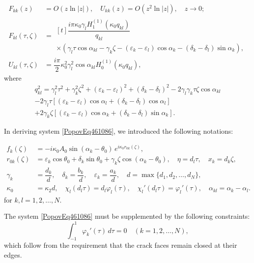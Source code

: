 \begin{align*}
	F_{kk}(z) &= O(z \ln |z|), \quad 
	U_{kk}(z) = O(z^2 \ln |z|), \quad z \to 0;
	\\
	F_{kl}(\tau, \zeta) &=
	\begin{multlined}[t]
		\dfrac{i\pi \kappa_0 \gamma_l H_1^{(1)}(\kappa_0 q_{kl})}{q_{kl}} 
		\\
		\times \left( \gamma_l \tau \cos \alpha_{kl} - \gamma_k \zeta - (\varepsilon_k - \varepsilon_l) \cos \alpha_k - (\delta_k - \delta_l) \sin \alpha_k \right),
	\end{multlined}
	\\
	U_{kl}(\tau, \zeta) &= \dfrac{i\pi}{2} \kappa_0^2 \gamma_l^2 \cos \alpha_{kl} H_0^{(1)}(\kappa_0 q_{kl}),
\end{align*}
%
where
\begin{multline*}
	q_{kl}^2 = \gamma_l^2 \tau^2 + \gamma_k^2 \zeta^2 + (\varepsilon_k - \varepsilon_l)^2 + (\delta_k - \delta_l)^2 
	- 2 \gamma_l \gamma_k \tau \zeta \cos \alpha_{kl}
	\\
	- 2 \gamma_l \tau \left[ (\varepsilon_k - \varepsilon_l) \cos \alpha_l + (\delta_k - \delta_l) \cos \alpha_l \right]
	\\
	+ 2 \gamma_k \zeta \left[ (\varepsilon_k - \varepsilon_l) \cos \alpha_k + (\delta_k - \delta_l) \sin \alpha_k \right].
\end{multline*}

In deriving system \eqref{PopovEq461086}, we introduced the following notations:

\begin{align*}
	f_k(\zeta) &= -i \kappa_0 A_0 \sin(\alpha_k - \theta_0)\, e^{i \kappa_0 r_{0k}(\zeta)},
	\\[0.5em]
	r_{0k}(\zeta) &= \varepsilon_k \cos \theta_0 + \delta_k \sin \theta_0 + \gamma_k \zeta \cos(\alpha_k - \theta_0),\quad
	\eta = d_l \tau, \quad x_k = d_k \zeta, 
	\\
	 \gamma_k &= \dfrac{d_k}{d}, \quad 
	\delta_k = \dfrac{b_k}{d}, \quad \varepsilon_k = \dfrac{a_k}{d}, \quad d = \max \{ d_1, d_2, \dots, d_N \},
	\\
	\kappa_0 &= \kappa_2 d, \quad \chi_l(d_l \tau) = d_l \varphi_l(\tau), \quad \chi_l'(d_l \tau) = \varphi_l'(\tau), \quad \alpha_{kl} = \alpha_k - \alpha_l.
\end{align*}
%
for \( k, l = 1, 2, \dots, N \).

The system \eqref{PopovEq461086} must be supplemented by the following constraints:
\begin{equation} \label{PopovEq370089} 
	\int_{-1}^{1} \varphi_k'(\tau)\, d\tau = 0 \quad (k = 1, 2, \dots, N),
\end{equation}
which follow from the requirement that the crack faces remain closed at their edges.

